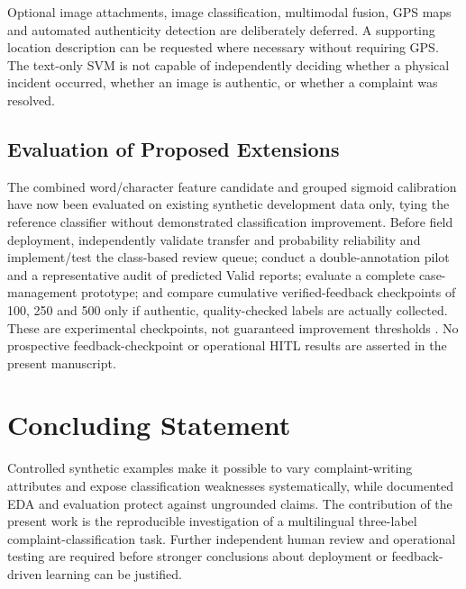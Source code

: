 Optional image attachments, image classification, multimodal fusion, GPS maps and automated authenticity detection are deliberately deferred. A supporting location description can be requested where necessary without requiring GPS. The text-only SVM is not capable of independently deciding whether a physical incident occurred, whether an image is authentic, or whether a complaint was resolved.

\subsection{Evaluation of Proposed Extensions}
The combined word/character feature candidate and grouped sigmoid calibration have now been evaluated on existing synthetic development data only, tying the reference classifier without demonstrated classification improvement. Before field deployment, independently validate transfer and probability reliability and implement/test the class-based review queue; conduct a double-annotation pilot and a representative audit of predicted Valid reports; evaluate a complete case-management prototype; and compare cumulative verified-feedback checkpoints of 100, 250 and 500 only if authentic, quality-checked labels are actually collected. These are experimental checkpoints, not guaranteed improvement thresholds \cite{figueroa2012,ghose2024,fleisig2024}. No prospective feedback-checkpoint or operational HITL results are asserted in the present manuscript.

\section{Concluding Statement}
Controlled synthetic examples make it possible to vary complaint-writing attributes and expose classification weaknesses systematically, while documented EDA and evaluation protect against ungrounded claims. The contribution of the present work is the reproducible investigation of a multilingual three-label complaint-classification task. Further independent human review and operational testing are required before stronger conclusions about deployment or feedback-driven learning can be justified.
